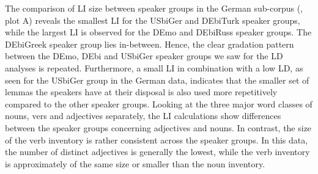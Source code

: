 \documentclass[output=paper,colorlinks,citecolor=brown]{langscibook}
\begin{document}
The comparison of LI size between speaker groups in the German sub-corpus (, plot A) reveals the smallest LI for the USbiGer and DEbiTurk speaker groups, while the largest LI is observed for the DEmo and DEbiRuss speaker groups. The DEbiGreek speaker group lies in-between. Hence, the clear gradation pattern between the DEmo, DEbi and USbiGer speaker groups we saw for the LD analyses is repeated. Furthermore, a small LI in combination with a low LD, as seen for the USbiGer group in the German data, indicates that the smaller set of lemmas the speakers have at their disposal is also used more repetitively compared to the other speaker groups. Looking at the three major word classes of nouns, vers and adjectives separately, the LI calculations show differences between the speaker groups concerning adjectives and nouns. In contrast, the size of the verb inventory is rather consistent across the speaker groups. In this data, the number of distinct adjectives is generally the lowest, while the verb inventory is approximately of the same size or smaller than the noun inventory.
\vfill
\end{document}
